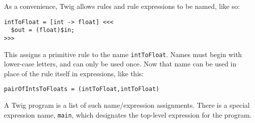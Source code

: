 As a convenience, Twig allows rules and rule expressions to be named, like so:

\begin{verbatim}
intToFloat = [int -> float] <<<
  $out = (float)$in;
>>>
\end{verbatim}

This assigns a primitive rule to the name \texttt{intToFloat}. Names must begin with lower-case letters, and can only be used once. Now that name can be used in place of the rule itself in expressions, like this:

\begin{verbatim}
pairOfIntsToFloats = (intToFloat,intToFloat)
\end{verbatim}

A Twig program is a list of such name/expression assignments. There is a special expression name, \texttt{main}, which designates the top-level expression for the program.

% 
% 
